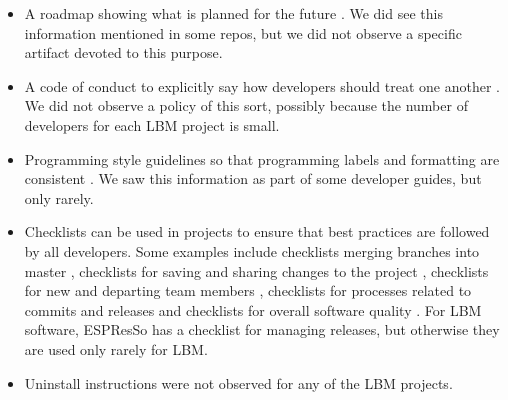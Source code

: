 \documentclass[final, 3p, times, authoryear]{elsarticle}
\begin{document}
\begin{itemize}
\item A roadmap showing what is planned for the future \citep{Yo2021,
ThielEtAl2020, vanGompelEtAl2016}.  We did see this information mentioned in
some repos, but we did not observe a specific artifact devoted to this purpose.
\item A code of conduct to explicitly say how developers should treat one
another \citep{Yo2021, ThielEtAl2020}.  We did not observe a policy of this
sort, possibly because the number of developers for each LBM project is small.
\item Programming style guidelines so that programming labels and formatting are
consistent \citep{TobiasEtAl2018, ThielEtAl2020, OrvizEtAl2017, Zadka2018,
vanGompelEtAl2016, WilsonEtAl2014}.  We saw this information as part of
some developer guides, but only rarely.
\item Checklists can be used in projects to ensure that best practices are
followed by all developers.  Some examples include checklists merging branches
into master \citep{Brown2015}, checklists for saving and sharing changes to the
project \citep{WilsonEtAl2016}, checklists for new and departing team members
\citep{HerouxAndBernholdt2018}, checklists for processes related to commits and
releases \citep{HerouxEtAl2008} and checklists for overall software quality
\citep{ThielEtAl2020, SSI2022}.  For LBM software, ESPResSo has a checklist for
managing releases, but otherwise they are used only rarely for LBM.
\item Uninstall instructions \citep{vanGompelEtAl2016} were not observed for any
of the LBM projects.
\end{itemize}
\end{document}

